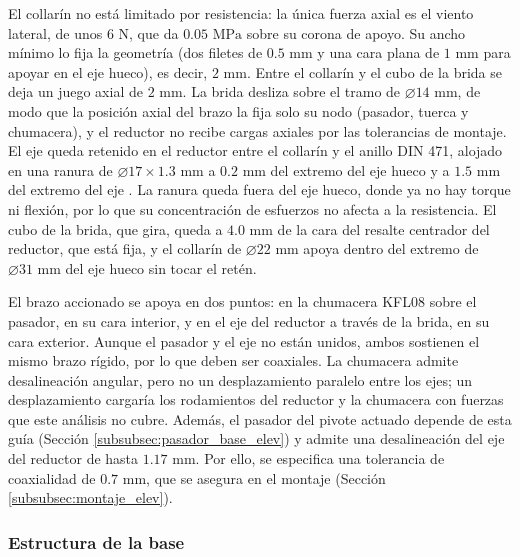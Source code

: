 \documentclass[../../General.tex]{subfiles}
\begin{document}
El collarín no está limitado por resistencia: la única fuerza axial es el viento lateral, de unos $6\text{ N}$, que da $0.05\text{ MPa}$ sobre su corona de apoyo. Su ancho mínimo lo fija la geometría (dos filetes de $0.5\text{ mm}$ y una cara plana de $1\text{ mm}$ para apoyar en el eje hueco), es decir, $2\text{ mm}$. Entre el collarín y el cubo de la brida se deja un juego axial de $2\text{ mm}$. La brida desliza sobre el tramo de $\varnothing 14\text{ mm}$, de modo que la posición axial del brazo la fija solo su nodo (pasador, tuerca y chumacera), y el reductor no recibe cargas axiales por las tolerancias de montaje. El eje queda retenido en el reductor entre el collarín y el anillo DIN 471, alojado en una ranura de $\varnothing 17 \times 1.3\text{ mm}$ a $0.2\text{ mm}$ del extremo del eje hueco y a $1.5\text{ mm}$ del extremo del eje \citep{din471}. La ranura queda fuera del eje hueco, donde ya no hay torque ni flexión, por lo que su concentración de esfuerzos no afecta a la resistencia. El cubo de la brida, que gira, queda a $4.0\text{ mm}$ de la cara del resalte centrador del reductor, que está fija, y el collarín de $\varnothing 22\text{ mm}$ apoya dentro del extremo de $\varnothing 31\text{ mm}$ del eje hueco sin tocar el retén.

El brazo accionado se apoya en dos puntos: en la chumacera KFL08 sobre el pasador, en su cara interior, y en el eje del reductor a través de la brida, en su cara exterior. Aunque el pasador y el eje no están unidos, ambos sostienen el mismo brazo rígido, por lo que deben ser coaxiales. La chumacera admite desalineación angular, pero no un desplazamiento paralelo entre los ejes; un desplazamiento cargaría los rodamientos del reductor y la chumacera con fuerzas que este análisis no cubre. Además, el pasador del pivote actuado depende de esta guía (Sección \ref{subsubsec:pasador_base_elev}) y admite una desalineación del eje del reductor de hasta $1.17\text{ mm}$. Por ello, se especifica una tolerancia de coaxialidad de $0.7\text{ mm}$, que se asegura en el montaje (Sección \ref{subsubsec:montaje_elev}).

\subsubsection{Estructura de la base}
\end{document}
